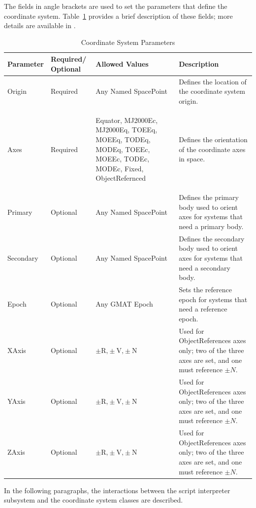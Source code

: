 The fields in angle brackets are used to set the parameters that define the coordinate system.
Table~\ref{table:CSParms} provides a brief description of these fields; more details are available
in \cite{mathSpec}.

%
\begin{table}
\caption{\label{table:CSParms}Coordinate System Parameters}
\begin{center}\begin{tabular}{|p{0.8in}|p{0.9in}|p{1.3in}|p{2.5in}|}
\hline
Parameter&
Required/ Optional&
Allowed Values&
Description\tabularnewline
\hline
\hline
Origin&
Required&
\begin{flushleft}Any Named SpacePoint\end{flushleft}&
Defines the location of the coordinate system origin.\tabularnewline
\hline
Axes&
Required&
\begin{flushleft}Equator, MJ2000Ec, MJ2000Eq, TOEEq, MOEEq, TODEq,
MODEq, TOEEc, MOEEc, TODEc, MODEc, Fixed, ObjectRefernced\end{flushleft}&
Defines the orientation of the coordinate axes in space.\tabularnewline
\hline
Primary&
Optional&
\begin{flushleft}Any Named SpacePoint\end{flushleft}&
Defines the primary body used to orient axes for systems that need
a primary body.\tabularnewline
\hline
Secondary&
Optional&
\begin{flushleft}Any Named SpacePoint\end{flushleft}&
Defines the secondary body used to orient axes for systems that need
a secondary body.\tabularnewline
\hline
Epoch&
Optional&
Any GMAT Epoch&
Sets the reference epoch for systems that need a reference epoch.\tabularnewline
\hline
XAxis&
Optional&
$\pm\textrm{R,}\pm\textrm{V,}\pm\textrm{N}$&
Used for ObjectReferences axes only; two of the three axes are set,
and one must reference $\pm N$.\tabularnewline
\hline
YAxis&
Optional&
$\pm\textrm{R,}\pm\textrm{V,}\pm\textrm{N}$&
Used for ObjectReferences axes only; two of the three axes are set,
and one must reference $\pm N$.\tabularnewline
\hline
ZAxis&
Optional&
$\pm\textrm{R,}\pm\textrm{V,}\pm\textrm{N}$&
Used for ObjectReferences axes only; two of the three axes are set,
and one must reference $\pm N$.\tabularnewline
\hline
\end{tabular}\end{center}
\end{table}

In the following paragraphs, the interactions between the script interpreter subsystem and the
coordinate system classes are described.

